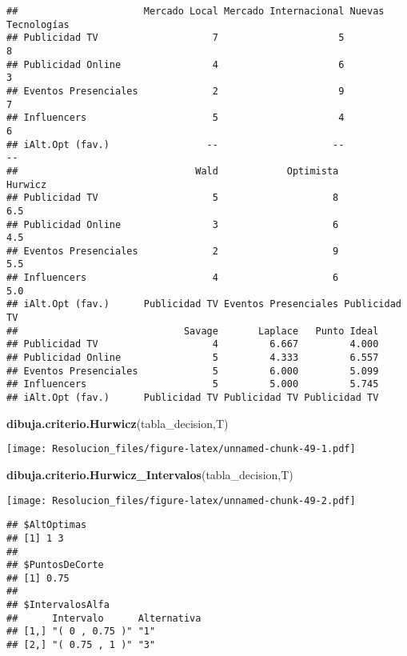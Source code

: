 \documentclass[
]{article}
\newenvironment{Shaded}{\begin{snugshade}}{\end{snugshade}}
\newcommand{\FunctionTok}[1]{\textcolor[rgb]{0.13,0.29,0.53}{\textbf{#1}}}
\newcommand{\NormalTok}[1]{#1}
\begin{document}
\begin{verbatim}
##                      Mercado Local Mercado Internacional Nuevas Tecnologías
## Publicidad TV                    7                     5                  8
## Publicidad Online                4                     6                  3
## Eventos Presenciales             2                     9                  7
## Influencers                      5                     4                  6
## iAlt.Opt (fav.)                 --                    --                 --
##                               Wald            Optimista       Hurwicz
## Publicidad TV                    5                    8           6.5
## Publicidad Online                3                    6           4.5
## Eventos Presenciales             2                    9           5.5
## Influencers                      4                    6           5.0
## iAlt.Opt (fav.)      Publicidad TV Eventos Presenciales Publicidad TV
##                             Savage       Laplace   Punto Ideal
## Publicidad TV                    4         6.667         4.000
## Publicidad Online                5         4.333         6.557
## Eventos Presenciales             5         6.000         5.099
## Influencers                      5         5.000         5.745
## iAlt.Opt (fav.)      Publicidad TV Publicidad TV Publicidad TV
\end{verbatim}

\begin{Shaded}
\begin{Highlighting}[]
\FunctionTok{dibuja.criterio.Hurwicz}\NormalTok{(tabla\_decision,T)}
\end{Highlighting}
\end{Shaded}

\texttt{[image: Resolucion\_files/figure-latex/unnamed-chunk-49-1.pdf]}

\begin{Shaded}
\begin{Highlighting}[]
\FunctionTok{dibuja.criterio.Hurwicz\_Intervalos}\NormalTok{(tabla\_decision,T)}
\end{Highlighting}
\end{Shaded}

\texttt{[image: Resolucion\_files/figure-latex/unnamed-chunk-49-2.pdf]}

\begin{verbatim}
## $AltOptimas
## [1] 1 3
## 
## $PuntosDeCorte
## [1] 0.75
## 
## $IntervalosAlfa
##      Intervalo      Alternativa
## [1,] "( 0 , 0.75 )" "1"        
## [2,] "( 0.75 , 1 )" "3"
\end{verbatim}
\end{document}
